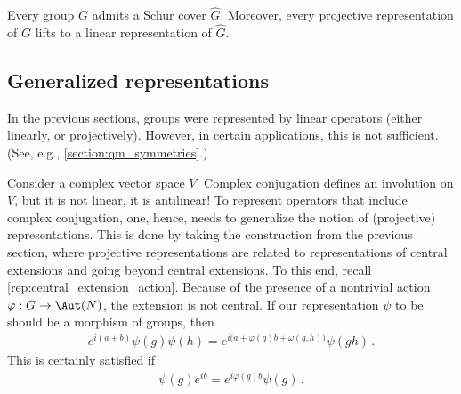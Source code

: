     \begin{property}
        Every group $G$ admits a Schur cover $\widehat{G}$. Moreover, every projective representation of $G$ lifts to a linear representation of $\widehat{G}$.
    \end{property}

\subsection{Generalized representations}

    In the previous sections, groups were represented by linear operators (either linearly, or projectively). However, in certain applications, this is not sufficient. (See, e.g., \cref{section:qm_symmetries}.)

    Consider a complex vector space $V$. Complex conjugation defines an involution on $V$, but it is not linear, it is antilinear! To represent operators that include complex conjugation, one, hence, needs to generalize the notion of (projective) representations. This is done by taking the construction from the previous section, where projective representations are related to representations of central extensions and going beyond central extensions. To this end, recall \cref{rep:central_extension_action}. Because of the presence of a nontrivial action $\varphi:G\rightarrow\Aut(N)$, the extension is not central. If our representation $\psi$ to be should be a morphism of groups, then
    \begin{gather}
        e^{i(a+b)}\psi(g)\psi(h) = e^{i\bigl(a + \varphi(g)b + \omega(g,h)\bigr)}\psi(gh)\,.
    \end{gather}
    This is certainly satisfied if
    \begin{gather}
        \psi(g)e^{ib} = e^{i\varphi(g)b}\psi(g)\,.
    \end{gather}

